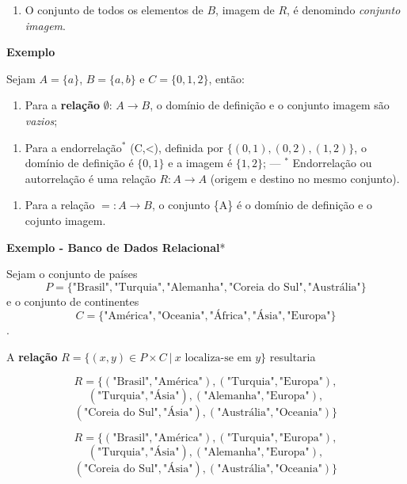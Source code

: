     \begin{enumerate}
\def\labelenumi{\arabic{enumi})}
\setcounter{enumi}{2}
\item
  O conjunto de todos os elementos de \(B\), imagem de \(R\), é
  denomindo \emph{conjunto imagem}.
\end{enumerate}

    \textbf{Exemplo}

Sejam \(A=\{a\}\), \(B=\{a,b\}\) e \(C=\{0,1,2\}\), então:

    \begin{enumerate}
\def\labelenumi{\arabic{enumi})}
\item
  Para a \textbf{relação} \(\emptyset\): \(A\rightarrow B\), o domínio
  de definição e o conjunto imagem são \emph{vazios};
\end{enumerate}

    \begin{enumerate}
\def\labelenumi{\arabic{enumi})}
\setcounter{enumi}{1}
\item
  Para a endorrelação\(^*\) (C,\textless), definida por
  \(\{(0,1),(0,2),(1,2)\}\), o domínio de definição é \(\{0,1\}\) e a
  imagem é \(\{1,2\}\); --- \(^*\) Endorrelação ou autorrelação é uma
  relação \(R:A\rightarrow A\) (origem e destino no mesmo conjunto).
\end{enumerate}

    \begin{enumerate}
\def\labelenumi{\arabic{enumi})}
\setcounter{enumi}{2}
\item
  Para a relação \(=: A\rightarrow B\), o conjunto \{A\} é o domínio de
  definição e o cojunto imagem.
\end{enumerate}

    \textbf{Exemplo - Banco de Dados Relacional}*

Sejam o conjunto de países
\[P=\{\text{"Brasil"},\text{"Turquia"},\text{"Alemanha"}, \text{"Coreia do Sul"},\text{"Austrália"}\}\]
e o conjunto de continentes
\[C=\{\text{"América"},\text{"Oceania"}, \text{"África"},\text{"Ásia"}, \text{"Europa"}\}\].

A \textbf{relação}
\(R=\{(x,y)\in P\times C\ |\ x\text{ localiza-se em }y\}\) resultaria

\[R=\{(\text{"Brasil"},\text{"América"}),(\text{"Turquia"},\text{"Europa"}),\]
\[(\text{"Turquia"},\text{"Ásia"}),(\text{"Alemanha"},\text{"Europa"}),\]
\[(\text{"Coreia do Sul"},\text{"Ásia"}),(\text{"Austrália"},\text{"Oceania"})\}\]

    \[R=\{(\text{"Brasil"},\text{"América"}),(\text{"Turquia"},\text{"Europa"}),\]
\[(\text{"Turquia"},\text{"Ásia"}),(\text{"Alemanha"},\text{"Europa"}),\]
\[(\text{"Coreia do Sul"},\text{"Ásia"}),(\text{"Austrália"},\text{"Oceania"})\}\]


